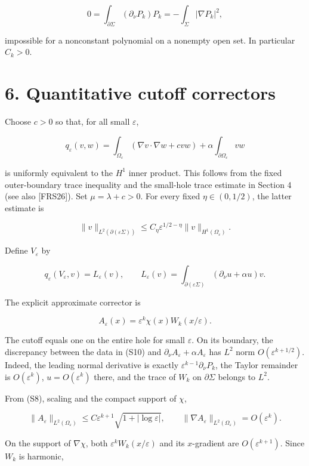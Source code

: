 \documentclass[11pt]{article}
\begin{document}
\[
 0=\int_{\partial\Sigma}(\partial_\nu P_k)P_k
   =-\int_\Sigma|\nabla P_k|^2,
\]

impossible for a nonconstant polynomial on a nonempty open set. In
particular \(C_k>0\).

\section{6. Quantitative cutoff
correctors}\label{quantitative-cutoff-correctors}

Choose \(c>0\) so that, for all small \(\varepsilon\),

\[
 q_\varepsilon(v,w)=
 \int_{\Omega_\varepsilon}(\nabla v\cdot\nabla w+cvw)
 +\alpha\int_{\partial\Omega_\varepsilon}vw
\]

is uniformly equivalent to the \(H^1\) inner product. This follows from
the fixed outer-boundary trace inequality and the small-hole trace
estimate in Section 4 (see also {[}FRS26{]}). Set \(\mu=\lambda+c>0\).
For every fixed \(\eta\in(0,1/2)\), the latter estimate is

\[
 \|v\|_{L^2(\partial(\varepsilon\Sigma))}
 \le C_\eta\varepsilon^{1/2-\eta}\|v\|_{H^1(\Omega_\varepsilon)}.
 \tag{S9}
\]

Define \(V_\varepsilon\) by

\[
 q_\varepsilon(V_\varepsilon,v)=L_\varepsilon(v),\qquad
 L_\varepsilon(v)=
 \int_{\partial(\varepsilon\Sigma)}(\partial_\nu u+\alpha u)v.
 \tag{S10}
\]

The explicit approximate corrector is

\[
 A_\varepsilon(x)=\varepsilon^k\chi(x)W_k(x/\varepsilon).
 \tag{S11}
\]

The cutoff equals one on the entire hole for small \(\varepsilon\). On
its boundary, the discrepancy between the data in (S10) and
\(\partial_\nu A_\varepsilon+\alpha A_\varepsilon\) has \(L^2\) norm
\(O(\varepsilon^{k+1/2})\). Indeed, the leading normal derivative is
exactly \(\varepsilon^{k-1}\partial_\nu P_k\), the Taylor remainder is
\(O(\varepsilon^k)\), \(u=O(\varepsilon^k)\) there, and the trace of
\(W_k\) on \(\partial\Sigma\) belongs to \(L^2\).

From (S8), scaling and the compact support of \(\chi\),

\[
 \|A_\varepsilon\|_{L^2(\Omega_\varepsilon)}
 \le C\varepsilon^{k+1}\sqrt{1+|\log\varepsilon|},
 \qquad
 \|\nabla A_\varepsilon\|_{L^2(\Omega_\varepsilon)}=O(\varepsilon^k).
 \tag{S12}
\]

On the support of \(\nabla\chi\), both
\(\varepsilon^kW_k(x/\varepsilon)\) and its \(x\)-gradient are
\(O(\varepsilon^{k+1})\). Since \(W_k\) is harmonic,
\end{document}
